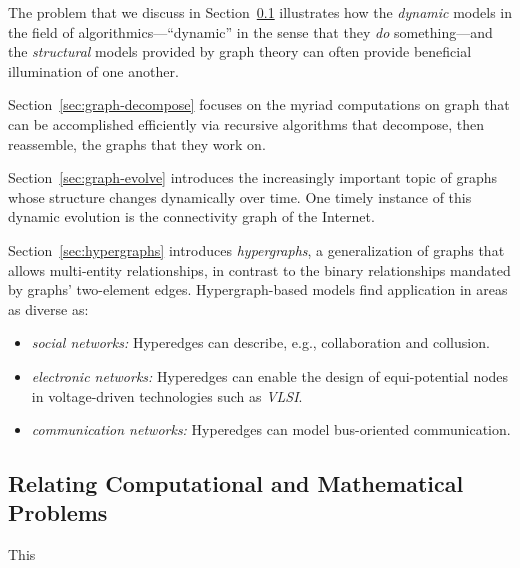 The problem that we discuss in Section~\ref{sec:Relate-CS-Math-Probs}
illustrates how the {\em dynamic} models in the field of
algorithmics---``dynamic'' in the sense that they {\em do}
something---and the {\em structural} models provided by graph theory
can often provide beneficial illumination of one another.

Section~\ref{sec:graph-decompose} 
 focuses on the myriad computations
on graph that can be accomplished efficiently via recursive algorithms
that decompose, then reassemble, the graphs that they work on.

Section~\ref{sec:graph-evolve} 
introduces the increasingly important topic of graphs whose structure
changes dynamically over time.  One timely instance of this dynamic
evolution is the connectivity graph of the Internet.

Section~\ref{sec:hypergraphs} 
 introduces {\it hypergraphs}, a generalization of
graphs that allows multi-entity relationships, in contrast to the
binary relationships mandated by graphs' two-element edges.
Hypergraph-based models find application in areas as diverse as:
\begin{itemize}
\item
{\it social networks:} Hyperedges can describe, e.g., collaboration
and collusion.
\item
{\it electronic networks:} Hyperedges can enable the design of
equi-potential nodes in voltage-driven technologies such as {\it
  VLSI}.
\item
{\it communication networks:} Hyperedges can model bus-oriented
communication.
\end{itemize}




\subsection{Relating Computational and Mathematical Problems}
\label{sec:Relate-CS-Math-Probs}

This 

